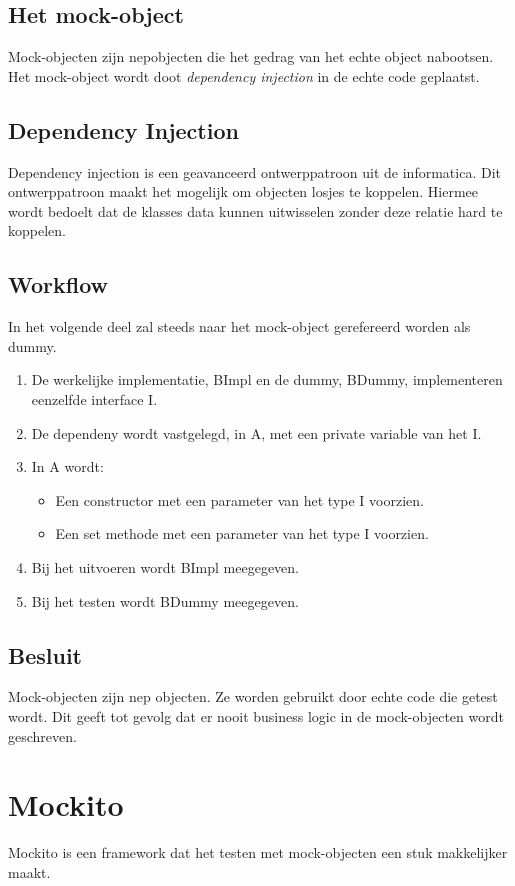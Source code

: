 \documentclass[11pt,a4paper]{article}
\begin{document}
\subsection{Het mock-object}
Mock-objecten zijn nepobjecten die het gedrag van het echte object nabootsen. Het mock-object wordt doot \emph{dependency injection} in de echte code geplaatst.
\subsection{Dependency Injection}
Dependency injection is een geavanceerd ontwerppatroon uit de informatica. Dit ontwerppatroon maakt het mogelijk om objecten losjes te koppelen. Hiermee wordt bedoelt dat de klasses data kunnen uitwisselen zonder deze relatie hard te koppelen.
\subsection{Workflow}
In het volgende deel zal steeds naar het mock-object gerefereerd worden als dummy.
\begin{enumerate}
	\item De werkelijke implementatie, BImpl en de dummy, BDummy, implementeren eenzelfde interface I.
	\item De dependeny wordt vastgelegd, in A, met een private variable van het I.
	\item In A wordt:
	\begin{itemize}
		\item Een constructor met een parameter van het type I voorzien.
		\item Een set methode met een parameter van het type I voorzien.
	\end{itemize}
	\item Bij het uitvoeren wordt BImpl meegegeven.
	\item Bij het testen wordt BDummy meegegeven.
\end{enumerate}
\subsection*{Besluit}
Mock-objecten zijn nep objecten. Ze worden gebruikt door echte code die getest wordt. Dit geeft tot gevolg dat er nooit business logic in de mock-objecten wordt geschreven.
\section{Mockito}
Mockito is een framework dat het testen met mock-objecten een stuk makkelijker maakt.
\end{document}
